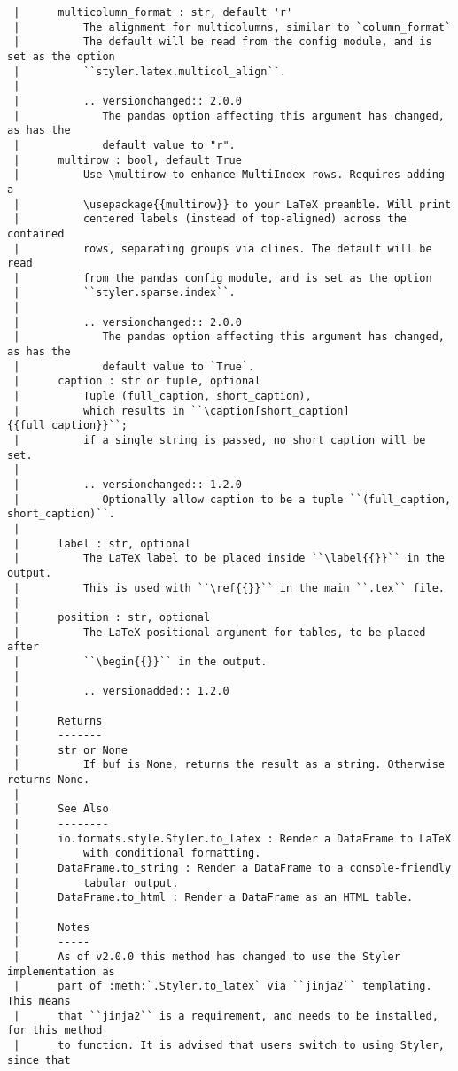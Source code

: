 \documentclass[
  letterpaper,
  DIV=11,
  numbers=noendperiod]{scrreprt}
\begin{document}
\begin{verbatim}
 |      multicolumn_format : str, default 'r'
 |          The alignment for multicolumns, similar to `column_format`
 |          The default will be read from the config module, and is set as the option
 |          ``styler.latex.multicol_align``.
 |      
 |          .. versionchanged:: 2.0.0
 |             The pandas option affecting this argument has changed, as has the
 |             default value to "r".
 |      multirow : bool, default True
 |          Use \multirow to enhance MultiIndex rows. Requires adding a
 |          \usepackage{{multirow}} to your LaTeX preamble. Will print
 |          centered labels (instead of top-aligned) across the contained
 |          rows, separating groups via clines. The default will be read
 |          from the pandas config module, and is set as the option
 |          ``styler.sparse.index``.
 |      
 |          .. versionchanged:: 2.0.0
 |             The pandas option affecting this argument has changed, as has the
 |             default value to `True`.
 |      caption : str or tuple, optional
 |          Tuple (full_caption, short_caption),
 |          which results in ``\caption[short_caption]{{full_caption}}``;
 |          if a single string is passed, no short caption will be set.
 |      
 |          .. versionchanged:: 1.2.0
 |             Optionally allow caption to be a tuple ``(full_caption, short_caption)``.
 |      
 |      label : str, optional
 |          The LaTeX label to be placed inside ``\label{{}}`` in the output.
 |          This is used with ``\ref{{}}`` in the main ``.tex`` file.
 |      
 |      position : str, optional
 |          The LaTeX positional argument for tables, to be placed after
 |          ``\begin{{}}`` in the output.
 |      
 |          .. versionadded:: 1.2.0
 |      
 |      Returns
 |      -------
 |      str or None
 |          If buf is None, returns the result as a string. Otherwise returns None.
 |      
 |      See Also
 |      --------
 |      io.formats.style.Styler.to_latex : Render a DataFrame to LaTeX
 |          with conditional formatting.
 |      DataFrame.to_string : Render a DataFrame to a console-friendly
 |          tabular output.
 |      DataFrame.to_html : Render a DataFrame as an HTML table.
 |      
 |      Notes
 |      -----
 |      As of v2.0.0 this method has changed to use the Styler implementation as
 |      part of :meth:`.Styler.to_latex` via ``jinja2`` templating. This means
 |      that ``jinja2`` is a requirement, and needs to be installed, for this method
 |      to function. It is advised that users switch to using Styler, since that

\end{verbatim}
\end{document}
